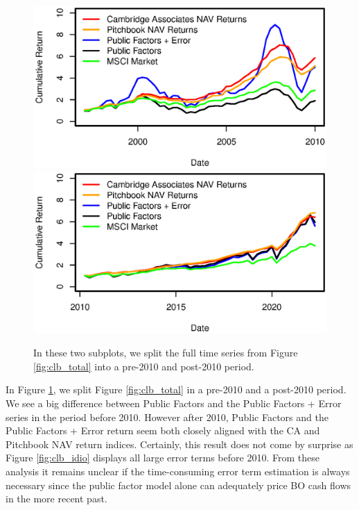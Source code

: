 \documentclass[12pt]{article}
\begin{document}
\begin{figure}[H]
	\centering
	\includegraphics{Figures/TotalErrorSeriesBOpre2010}
	\includegraphics{Figures/TotalErrorSeriesBOpost2010}
	\caption{
		In these two subplots, we split the full time series from Figure \ref{fig:clb_total} into a pre-2010 and post-2010 period.
	}
	\label{fig:clb_pre_post_2010}
\end{figure}




In Figure \ref{fig:clb_pre_post_2010}, we split Figure \ref{fig:clb_total} in a pre-2010 and a post-2010 period.
We see a big difference between Public Factors and the Public Factors + Error series in the period before 2010.
However after 2010, Public Factors and the Public Factors + Error return seem both closely aligned with the CA and Pitchbook NAV return indices.
Certainly, this result does not come by surprise as Figure \ref{fig:clb_idio} displays all large error terms before 2010.
From these analysis it remains unclear if the time-consuming error term estimation is always necessary since the public factor model alone can adequately price BO cash flows in the more recent past.
\end{document}
